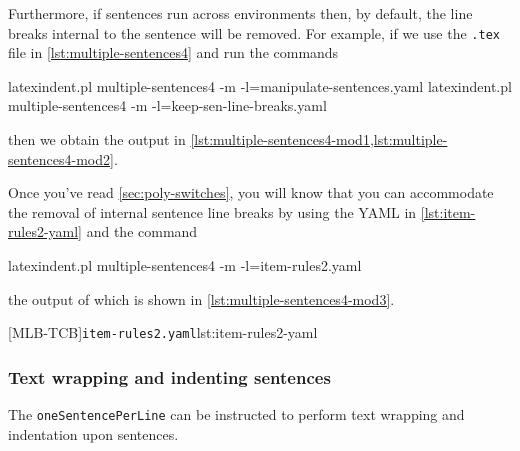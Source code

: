	Furthermore, if sentences run across environments then, by default, the line breaks
	internal to the sentence will be removed. For example, if we use the \texttt{.tex} file
	in \cref{lst:multiple-sentences4} and run the commands 
	\begin{commandshell}
latexindent.pl multiple-sentences4 -m -l=manipulate-sentences.yaml
latexindent.pl multiple-sentences4 -m -l=keep-sen-line-breaks.yaml
\end{commandshell}
	then we obtain the output in
	\cref{lst:multiple-sentences4-mod1,lst:multiple-sentences4-mod2}.
	\begin{widepage}
	\end{widepage}

	Once you've read \cref{sec:poly-switches}, you will know that you can accommodate the
	removal of internal sentence line breaks by using the YAML in \cref{lst:item-rules2-yaml}
	and the command  
	\begin{commandshell}
latexindent.pl multiple-sentences4 -m -l=item-rules2.yaml
\end{commandshell}
	the output of which is shown in \cref{lst:multiple-sentences4-mod3}.

	\begin{cmhtcbraster}
		[MLB-TCB]{\texttt{item-rules2.yaml}}{lst:item-rules2-yaml}
	\end{cmhtcbraster}

\subsubsection{Text wrapping and indenting sentences}
	The \texttt{oneSentencePerLine}  can be instructed to perform text wrapping and indentation upon sentences.

